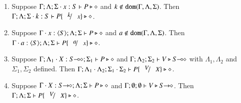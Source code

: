\begin{lemma}\label{l:subst}
	\begin{enumerate}[1.]
		\item	Suppose $\Gamma; \Lambda; \Sigma \cdot x:S  \vdash P \triangleright \diamond$ and
			$k \not\in \mathtt{dom}(\Gamma, \Lambda, \Sigma)$. 
			Then $\Gamma; \Lambda; \Sigma \cat k:S  \vdash P\subst{k}{x} \hastype \Proc$.

		\item	Suppose $\Gamma \cdot x:\langle S \rangle; \Lambda; \Sigma \vdash P \triangleright \diamond$ and
			$a \not\in \mathtt{dom}(\Gamma, \Lambda, \Sigma)$. 
			Then $\Gamma \cat a:\chtype{S}; \Lambda; \Sigma   \vdash P\subst{a}{x} \hastype \Proc$.

		\item	Suppose $\Gamma; \Lambda_1 \cdot X:S\!\! \multimap\!\! \diamond; \Sigma_1  \vdash P \triangleright \diamond$ 
			and $\Gamma; \Lambda_2; \Sigma_2  \vdash V \triangleright S\!\! \multimap\!\! \diamond$ with 
			$\Lambda_1, \Lambda_2$ and $\Sigma_1, \Sigma_2$ defined.  
			Then $\Gamma; \Lambda_1 \cat \Lambda_2; \Sigma_1 \cat \Sigma_2  \proves P\subst{V}{X} \hastype \Proc$.

		\item	Suppose $\Gamma \cdot X:S\!\! \rightarrow\!\! \diamond; \Lambda; \Sigma  \vdash P \triangleright \diamond$ and
			$\Gamma; \emptyset ; \emptyset  \vdash V \triangleright S\!\! \rightarrow\!\! \diamond$.
			Then $\Gamma; \Lambda; \Sigma  \proves P\subst{V}{X} \hastype \Proc$.
		\end{enumerate}
\end{lemma}

